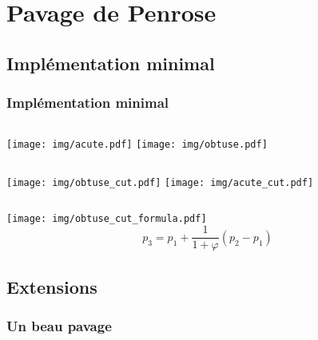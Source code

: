 \documentclass{beamer}
\begin{document}
\section{Pavage de Penrose}

\subsection{Implémentation minimal}
\begin{frame}
  \frametitle{Implémentation minimal}
  \begin{columns}
      \texttt{[image: img/acute.pdf]}
      \texttt{[image: img/obtuse.pdf]}
  \end{columns}
\end{frame}

\begin{frame}
  \begin{columns}
      \texttt{[image: img/obtuse\_cut.pdf]}
      \texttt{[image: img/acute\_cut.pdf]}
  \end{columns}
\end{frame}

\begin{frame}
  \begin{center}
    \texttt{[image: img/obtuse\_cut\_formula.pdf]}
    \[
      p_3 = p_1 + \frac{1}{1 + \varphi} (p_2 - p_1)
    \]
  \end{center}
\end{frame}
    
\subsection{Extensions}

\begin{frame}
  \frametitle{Un beau pavage}

\end{frame}
\end{document}
